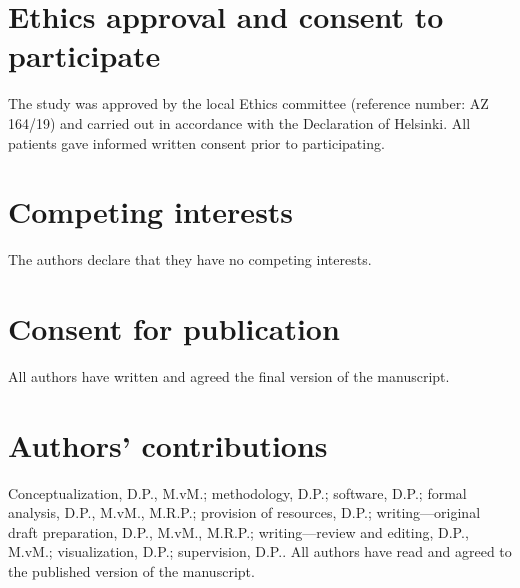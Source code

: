 \documentclass{bmcart}
\begin{document}
\begin{backmatter}
\section*{Ethics approval and consent to participate}%
The study was approved by the local Ethics committee (reference number: AZ 164/19) and carried out in accordance with the Declaration of Helsinki. All patients gave informed written consent prior to participating. 

\section*{Competing interests}
The authors declare that they have no competing interests.

\section*{Consent for publication}%
All authors have written and agreed the final version of the manuscript. 

\section*{Authors' contributions}
Conceptualization, D.P., M.vM.; methodology, D.P.; software, D.P.; formal analysis, D.P., M.vM., M.R.P.; provision of resources, D.P.; writing—original draft preparation, D.P., M.vM., M.R.P.; writing—review and editing, D.P., M.vM.; visualization, D.P.; supervision, D.P.. All authors have read and agreed to the published version of the manuscript.




\end{backmatter}
\end{document}
